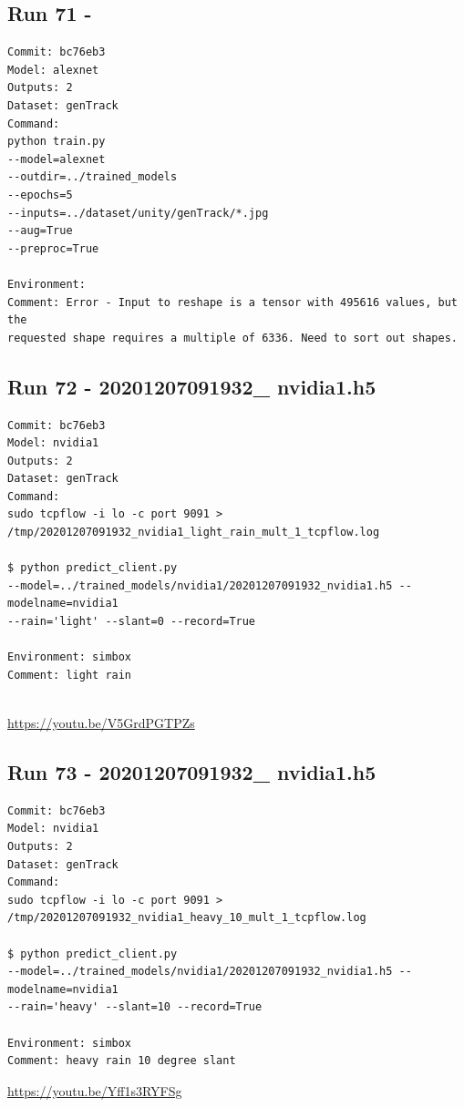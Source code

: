 \subsection{Run 71 - }
\begin{verbatim}
Commit: bc76eb3 
Model: alexnet
Outputs: 2 
Dataset: genTrack
Command:
python train.py
--model=alexnet
--outdir=../trained_models
--epochs=5
--inputs=../dataset/unity/genTrack/*.jpg
--aug=True
--preproc=True

Environment: 
Comment: Error - Input to reshape is a tensor with 495616 values, but the
requested shape requires a multiple of 6336. Need to sort out shapes.
\end{verbatim}

\subsection{Run 72 - 20201207091932\_ nvidia1.h5 }
\begin{verbatim}
Commit: bc76eb3 
Model: nvidia1
Outputs: 2
Dataset: genTrack
Command:
sudo tcpflow -i lo -c port 9091 >
/tmp/20201207091932_nvidia1_light_rain_mult_1_tcpflow.log

$ python predict_client.py
--model=../trained_models/nvidia1/20201207091932_nvidia1.h5 --modelname=nvidia1
--rain='light' --slant=0 --record=True

Environment: simbox
Comment: light rain


\end{verbatim}
\url{https://youtu.be/V5GrdPGTPZs}

\subsection{Run 73 - 20201207091932\_ nvidia1.h5}
\begin{verbatim}
Commit: bc76eb3 
Model: nvidia1
Outputs: 2
Dataset: genTrack
Command:
sudo tcpflow -i lo -c port 9091 >
/tmp/20201207091932_nvidia1_heavy_10_mult_1_tcpflow.log

$ python predict_client.py
--model=../trained_models/nvidia1/20201207091932_nvidia1.h5 --modelname=nvidia1
--rain='heavy' --slant=10 --record=True

Environment: simbox
Comment: heavy rain 10 degree slant
\end{verbatim}
\url{https://youtu.be/Yff1s3RYFSg}

